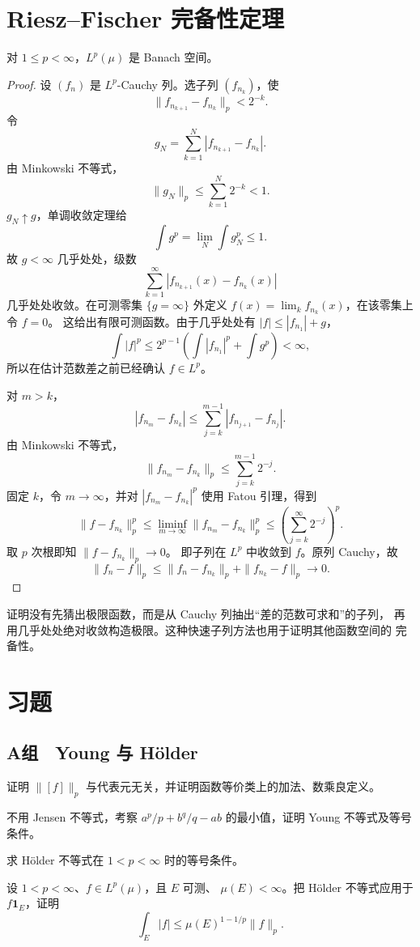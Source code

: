 \section{Riesz--Fischer 完备性定理}

\begin{theorem}
\label{thm:riesz-fischer}
对 \(1\le p<\infty\)，\(L^p(\mu)\) 是 Banach 空间。
\end{theorem}

\begin{proof}
设 \((f_n)\) 是 \(L^p\)-Cauchy 列。选子列 \((f_{n_k})\)，使
\[
 \|f_{n_{k+1}}-f_{n_k}\|_p<2^{-k}.
\]
令
\[
 g_N=\sum_{k=1}^{N}|f_{n_{k+1}}-f_{n_k}|.
\]
由 Minkowski 不等式，
\[
 \|g_N\|_p\le\sum_{k=1}^{N}2^{-k}<1.
\]
\(g_N\uparrow g\)，单调收敛定理给
\[
 \int g^p=\lim_N\int g_N^p\le1.
\]
故 \(g<\infty\) 几乎处处，级数
\[
 \sum_{k=1}^{\infty}
 |f_{n_{k+1}}(x)-f_{n_k}(x)|
\]
几乎处处收敛。在可测零集 \(\{g=\infty\}\) 外定义
\(f(x)=\lim_kf_{n_k}(x)\)，在该零集上令 \(f=0\)。
这给出有限可测函数。由于几乎处处有 \(|f|\le|f_{n_1}|+g\)，
\[
 \int|f|^p\le2^{p-1}\left(\int|f_{n_1}|^p+\int g^p\right)<\infty,
\]
所以在估计范数差之前已经确认 \(f\in L^p\)。

对 \(m>k\)，
\[
 |f_{n_m}-f_{n_k}|
 \le\sum_{j=k}^{m-1}|f_{n_{j+1}}-f_{n_j}|.
\]
由 Minkowski 不等式，
\[
 \|f_{n_m}-f_{n_k}\|_p
 \le\sum_{j=k}^{m-1}2^{-j}.
\]
固定 \(k\)，令 \(m\to\infty\)，并对
\(|f_{n_m}-f_{n_k}|^p\) 使用 Fatou 引理，得到
\[
 \|f-f_{n_k}\|_p^p
 \le\liminf_{m\to\infty}\|f_{n_m}-f_{n_k}\|_p^p
 \le\left(\sum_{j=k}^{\infty}2^{-j}\right)^p.
\]
取 \(p\) 次根即知 \(\|f-f_{n_k}\|_p\to0\)。
即子列在 \(L^p\) 中收敛到 \(f\)。原列 Cauchy，故
\[
 \|f_n-f\|_p
 \le\|f_n-f_{n_k}\|_p+\|f_{n_k}-f\|_p\to0.
\]
\end{proof}

\begin{remark}
证明没有先猜出极限函数，而是从 Cauchy 列抽出“差的范数可求和”的子列，
再用几乎处处绝对收敛构造极限。这种快速子列方法也用于证明其他函数空间的
完备性。
\end{remark}

\section*{习题}
\subsection*{A组　Young 与 Hölder}
\begin{enumerate}[label=\textbf{\thechapter.\arabic*.}]
证明 \(\|[f]\|_p\) 与代表元无关，并证明函数等价类上的加法、数乘良定义。

不用 Jensen 不等式，考察
\(a^p/p+b^q/q-ab\) 的最小值，证明 Young 不等式及等号条件。

求 Hölder 不等式在 \(1<p<\infty\) 时的等号条件。

设 \(1<p<\infty\)、\(f\in L^p(\mu)\)，且 \(E\) 可测、
\(\mu(E)<\infty\)。把 Hölder 不等式应用于 \(f\mathbf1_E\)，证明
\[
 \int_E|f|\le\mu(E)^{1-1/p}\|f\|_p.
\]

\end{enumerate}
